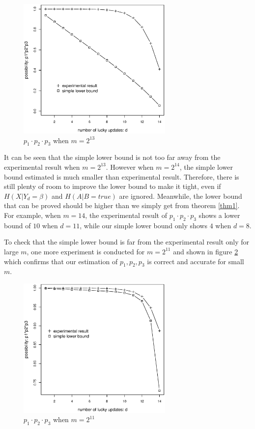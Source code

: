 \documentclass[10pt, conference, compsocconf]{IEEEtran}
\begin{document}
        \begin{figure}[!t]
        \centering
        \includegraphics[width=3in, trim=0mm 0mm 0mm 20mm]{p14.eps}
        \caption{$p_1 \cdot p_2 \cdot p_3$ when $m = 2^{13}$}\label{p14}
        \end{figure}

        It can be seen that the simple lower bound is not too
        far away from the experimental result when $m = 2^{13}$.
        However when $m = 2^{14}$, the simple lower bound
        estimated is much smaller than experimental result. Therefore,
        there is still plenty of room to improve the lower bound
        to make it tight, even if $H(X | Y_d = \beta)$ and $H(A | B = true)$
        are ignored. Meanwhile, the lower bound that can be proved should
        be higher than we simply get from theorem \ref{thm1}.
        For example, when $m = 14$, the experimental result
        of $p_1 \cdot p_2 \cdot p_3$ shows a lower bound of $10$
        when $d = 11$, while our simple lower bound only shows $4$
        when $d = 8$.

        To check that the simple lower bound is far from the experimental
        result only for large $m$, one more experiment is conducted
        for $m = 2^{11}$ and shown in figure \ref{p11}
        which confirms that our estimation
        of $p_1, p_2, p_3$ is correct and accurate for small $m$.

        \begin{figure}[!t]
        \centering
        \includegraphics[width=3in, trim=0mm 0mm 0mm 20mm]{p11.eps}
        \caption{$p_1 \cdot p_2 \cdot p_3$ when $m = 2^{11}$}\label{p11}
        \end{figure}
\end{document}
